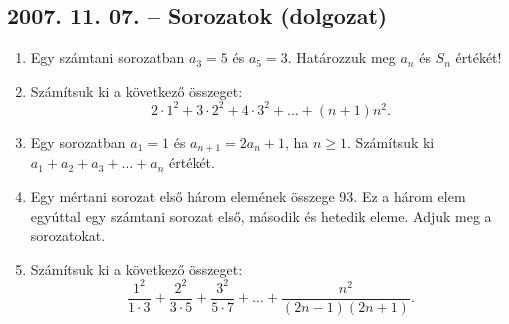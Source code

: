 \documentclass{article}
\begin{document}
\subsection*{2007. 11. 07. -- Sorozatok (dolgozat)}
\begin{enumerate}
\item Egy számtani sorozatban $a_3=5$ és $a_5=3$. 
Határozzuk meg $a_n$ és $S_n$ értékét!
\item Számítsuk ki a következő összeget:
$$2\cdot 1^2+3\cdot 2^2+4\cdot 3^2+\ldots+(n+1)n^2.$$
\item Egy sorozatban $a_1=1$ és $a_{n+1}=2a_n+1$, ha $n \ge 1$.
Számítsuk ki $a_1+a_2+a_3+\ldots+a_n$ értékét.
\item Egy mértani sorozat első három elemének összege 93. Ez a három elem egyúttal egy számtani sorozat első, második és hetedik eleme. Adjuk meg a sorozatokat.
\item Számítsuk ki a következő összeget:
$$\frac{1^2}{1\cdot 3}+ 
\frac{2^2}{3\cdot 5}+
\frac{3^2}{5\cdot 7}+\ldots+
\frac{n^2}{(2n-1)(2n+1)}.$$
\end{enumerate}
\end{document}
